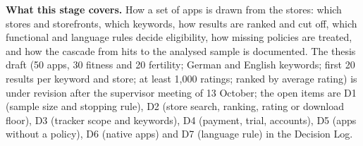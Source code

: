 
\noindent\textbf{What this stage covers.} How a set of apps is drawn from the stores: which stores and storefronts, which keywords, how results are ranked and cut off, which functional and language rules decide eligibility, how missing policies are treated, and how the cascade from hits to the analysed sample is documented. The thesis draft (50 apps, 30 fitness and 20 fertility; German and English keywords; first 20 results per keyword and store; at least 1{,}000 ratings; ranked by average rating) is under revision after the supervisor meeting of 13 October; the open items are D1 (sample size and stopping rule), D2 (store search, ranking, rating or download floor), D3 (tracker scope and keywords), D4 (payment, trial, accounts), D5 (apps without a policy), D6 (native apps) and D7 (language rule) in the Decision Log.


